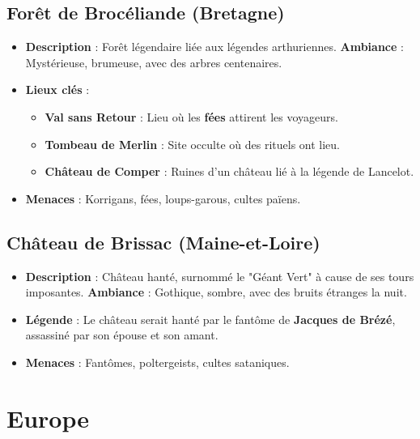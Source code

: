 \documentclass[10pt,a5paper,twoside]{book}
\begin{document}
\subsection{Forêt de Brocéliande (Bretagne)}
\begin{itemize}
	\item \textbf{Description} : Forêt légendaire liée aux légendes arthuriennes. \textbf{Ambiance} : Mystérieuse, brumeuse, avec des arbres centenaires.
	\item \textbf{Lieux clés} :
	\begin{itemize}
		\item \textbf{Val sans Retour} : Lieu où les \textbf{fées} attirent les voyageurs.
		\item \textbf{Tombeau de Merlin} : Site occulte où des rituels ont lieu.
		\item \textbf{Château de Comper} : Ruines d'un château lié à la légende de Lancelot.
		\end{itemize}
	\item \textbf{Menaces} : Korrigans, fées, loups-garous, cultes païens.
\end{itemize}

\subsection{Château de Brissac (Maine-et-Loire)}
\begin{itemize}
	\item \textbf{Description} : Château hanté, surnommé le "Géant Vert" à cause de ses tours imposantes. \textbf{Ambiance} : Gothique, sombre, avec des bruits étranges la nuit.
	\item \textbf{Légende} : Le château serait hanté par le fantôme de \textbf{Jacques de Brézé}, assassiné par son épouse et son amant.
	\item \textbf{Menaces} : Fantômes, poltergeists, cultes sataniques.
\end{itemize}

\newpage

\section{Europe}
\end{document}
